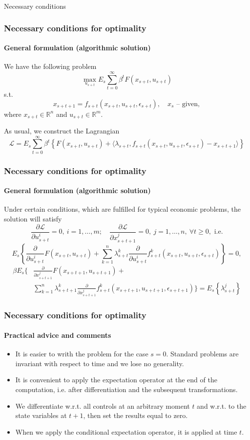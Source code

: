 \documentclass[10pt]{beamer}
\theoremstyle{definition}
\begin{document}
\begin{section}{Necessary conditions}\label{sec:NCs}

\begin{frame}
\frametitle{Necessary conditions for optimality}\framesubtitle{General formulation
(algorithmic solution)} We have the following problem
$$\max_{u_{s+t}}E_s\sum_{t=0}^\infty \beta^t F(x_{s+t},u_{s+t})$$ s.t.
$$x_{s+t+1}=f_{s+t}(x_{s+t},u_{s+t},\epsilon_{s+t}),\quad x_s\textrm{ --
given},$$ where $x_{s+t}\in \mathbb{R}^n$ and $u_{s+t}\in \mathbb{R}^m$.

As usual, we construct the Lagrangian $$\mathcal{L}=E_s\sum_{t=0}^\infty \beta^t
\left\{ F(x_{s+t},u_{s+t}) + \langle \lambda_{s+t},
f_{s+t}(x_{s+t},u_{s+t},\epsilon_{s+t})-x_{s+t+1} \rangle \right\}$$

\end{frame}


\begin{frame} \frametitle{Necessary conditions for optimality}\framesubtitle{General formulation
(algorithmic solution)} Under certain conditions, which are fulfilled for typical economic problems, the solution will satisfy 
$$\frac{\partial \mathcal{L}}{\partial u_{s+t}^i}=0,~i=1,\ldots,m; \quad \frac{\partial \mathcal{L}}{\partial x_{s+t+1}^j}=0,~j=1,\ldots,n,~\forall t \geq 0,\textrm{ i.e.} $$
$$E_s
\left\{ \frac{\partial}{\partial u_{s+t}^i}F(x_{s+t},u_{s+t}) + \sum_{k=1}^n \lambda^k_{s+t}
\frac{\partial}{\partial u_{s+t}^i}f^k_{s+t}(x_{s+t},u_{s+t},\epsilon_{s+t}) \right\}=0,$$
\begin{equation*}
    \begin{split}
\beta E_s
\Biggl\{ & \frac{\partial}{\partial x_{s+t+1}^j} F(x_{s+t+1},u_{s+t+1}) + \\ &  \sum_{k=1}^n \lambda^k_{s+t+1}
\frac{\partial}{\partial x_{s+t+1}^j}f^k_{s+t}(x_{s+t+1},u_{s+t+1},\epsilon_{s+t+1}) \Biggr\} =  E_s
\left\{ \lambda_{s+t}^j \right\}
    \end{split}
\end{equation*}
\end{frame}



\begin{frame}
\frametitle{Necessary conditions for optimality}
\framesubtitle{Practical advice and comments}
\begin{itemize}\itemsep1em
\item It is easier to writh the problem for the case $ s=0 $. Standard problems are invariant with respect to time and we lose no generality. 
\item It is convenient to apply the expectation operator at the end of the computation, i.e. after differentiation and the subsequent transformations.
\item We differentiate w.r.t. all controls at an arbitrary moment $ t $ and w.r.t. to the state variables at $ t+1 $, then set the results equal to zero.
\item When we apply the conditional expectation operator, it is applied at time $ t $.
\end{itemize}
\end{frame}




\end{section}
\end{document}
